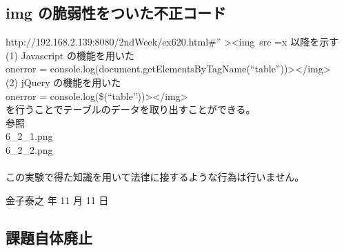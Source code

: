 \documentclass[a4j]{jarticle}
\begin{document}
    \subsection{img の脆弱性をついた不正コード}
      http://192.168.2.139:8080/2ndWeek/ex620.html\#” \textgreater \textless img\ src =x 以降を示す\\
      (1) Javascript の機能を用いた\\
      onerror = console.log(document.getElementsByTagName(“table”))\textgreater \textless/img\textgreater\\
      (2) jQuery の機能を用いた\\
      onerror = console.log(\$(“table”))\textgreater \textless/img\textgreater \\
      を行うことでテーブルのデータを取り出すことができる。\\
      参照\\
      6\_2\_1.png\\
      6\_2\_2.png\\
      \vspace{2em}\\
      この実験で得た知識を用いて法律に接するような行為は行いません。
      \begin{flushright}
        金子泰之 年 11 月 11 日
      \end{flushright}
    \subsection{課題自体廃止}
\end{document}
